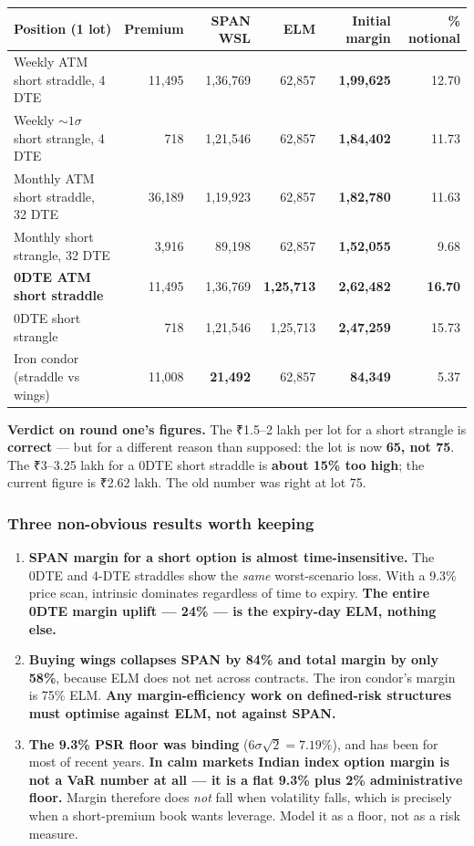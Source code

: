 \documentclass[11pt,a4paper]{article}
\newcommand{\rs}{₹}
\begin{document}
\begin{center}
\small
\begin{tabular}{@{}lrrrrr@{}}
\toprule
Position (1 lot) & Premium & SPAN WSL & ELM & \textbf{Initial margin} & \% notional \\
\midrule
Weekly ATM short straddle, 4 DTE & 11{,}495 & 1{,}36{,}769 & 62{,}857 & \textbf{1{,}99{,}625} & 12.70 \\
Weekly $\sim1\sigma$ short strangle, 4 DTE & 718 & 1{,}21{,}546 & 62{,}857 & \textbf{1{,}84{,}402} & 11.73 \\
Monthly ATM short straddle, 32 DTE & 36{,}189 & 1{,}19{,}923 & 62{,}857 & \textbf{1{,}82{,}780} & 11.63 \\
Monthly short strangle, 32 DTE & 3{,}916 & 89{,}198 & 62{,}857 & \textbf{1{,}52{,}055} & 9.68 \\
\textbf{0DTE ATM short straddle} & 11{,}495 & 1{,}36{,}769 & \textbf{1{,}25{,}713} & \textbf{2{,}62{,}482} & \textbf{16.70} \\
0DTE short strangle & 718 & 1{,}21{,}546 & 1{,}25{,}713 & \textbf{2{,}47{,}259} & 15.73 \\
Iron condor (straddle vs wings) & 11{,}008 & \textbf{21{,}492} & 62{,}857 & \textbf{84{,}349} & 5.37 \\
\bottomrule
\end{tabular}
\end{center}

\textbf{Verdict on round one's figures.} The \rs 1.5--2 lakh per lot for a short
strangle is \textbf{correct} --- but for a different reason than supposed: the lot
is now \textbf{65, not 75}. The \rs 3--3.25 lakh for a 0DTE short straddle is
\textbf{about 15\% too high}; the current figure is \rs 2.62 lakh. The old number
was right at lot 75.

\subsubsection{Three non-obvious results worth keeping}

\begin{enumerate}
\item \textbf{SPAN margin for a short option is almost time-insensitive.} The 0DTE
and 4-DTE straddles show the \emph{same} worst-scenario loss. With a 9.3\% price
scan, intrinsic dominates regardless of time to expiry. \textbf{The entire 0DTE
margin uplift --- 24\% --- is the expiry-day ELM, nothing else.}
\item \textbf{Buying wings collapses SPAN by 84\% and total margin by only 58\%},
because ELM does not net across contracts. The iron condor's margin is 75\% ELM.
\textbf{Any margin-efficiency work on defined-risk structures must optimise
against ELM, not against SPAN.}
\item \textbf{The 9.3\% PSR floor was binding} ($6\sigma\sqrt{2} = 7.19\%$), and
has been for most of recent years. \textbf{In calm markets Indian index option
margin is not a VaR number at all --- it is a flat 9.3\% plus 2\% administrative
floor.} Margin therefore does \emph{not} fall when volatility falls, which is
precisely when a short-premium book wants leverage. Model it as a floor, not as a
risk measure.
\end{enumerate}
\end{document}
